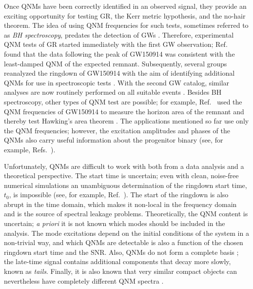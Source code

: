 Once QNMs have been correctly identified in an observed signal, they provide an exciting opportunity for testing GR, the Kerr metric hypothesis, and the no-hair theorem. 
The idea of using QNM frequencies for such tests, sometimes referred to as \emph{BH spectroscopy}, predates the detection of GWs \cite{Dreyer:2003bv, Berti:2005ys, Berti:2007zu, Berti:2016lat}.
Therefore, experimental QNM tests of GR started immediately with the first GW observation; Ref.~\cite{LIGOScientific:2016lio} found that the data following the peak of GW150914 was consistent with the least-damped QNM of the expected remnant.
Subsequently, several groups reanalyzed the ringdown of GW150914 with the aim of identifying additional QNMs for use in spectroscopic tests \cite{Carullo:2019flw, Isi:2019aib, Brito:2018rfr}. 
With the second GW catalog, similar analyses are now routinely performed on all suitable events \cite{LIGOScientific:2020tif}.
Besides BH spectroscopy, other types of QNM test are possible; for example, Ref.~\cite{Isi:2020tac} used the QNM frequencies of GW150914 to measure the horizon area of the remnant and thereby test Hawking's area theorem \cite{Hawking:1971tu}.
The applications mentioned so far use only the QNM frequencies; however, the excitation amplitudes and phases of the QNMs also carry useful information about the progenitor binary (see, for example, Refs.~\cite{Hughes:2019zmt, Berti:2006wq}). 

Unfortunately, QNMs are difficult to work with both from a data analysis and a theoretical perspective. 
The start time is uncertain; even with clean, noise-free numerical simulations an unambiguous determination of the ringdown start time, $t_0$, is impossible (see, for example, Ref.~\cite{Thrane:2017lqn}). 
The start of the ringdown is also abrupt in the time domain, which makes it non-local in the frequency domain and is the source of spectral leakage problems. 
Theoretically, the QNM content is uncertain; \emph{a priori} it is not known which modes should be included in the analysis.
The mode excitations depend on the initial conditions of the system in a non-trivial way, and which QNMs are detectable is also a function of the chosen ringdown start time and the SNR.
Also, QNMs do not form a complete basis \cite{Berti:2009kk}; the late-time signal contains additional components that decay more slowly, known as \emph{tails}.
Finally, it is also known that very similar compact objects can nevertheless have completely different QNM spectra \cite{Nollert:1996rf}.

